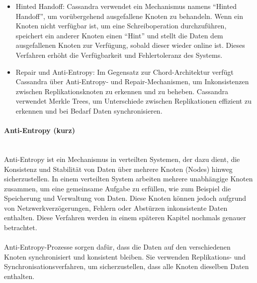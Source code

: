 \documentclass[../vs-script-first-v01.tex]{subfiles}
\begin{document}
\begin{itemize}
\item Hinted Handoff: Cassandra verwendet ein Mechanismus namens \enquote{Hinted Handoff}, um vorübergehend ausgefallene Knoten zu behandeln. Wenn ein Knoten nicht verfügbar ist, um eine Schreiboperation durchzuführen, speichert ein anderer Knoten einen \enquote{Hint} und stellt die Daten dem ausgefallenen Knoten zur Verfügung, sobald dieser wieder online ist. Dieses Verfahren erhöht die Verfügbarkeit und Fehlertoleranz des Systems.
\item Repair und Anti-Entropy: Im Gegensatz zur Chord-Architektur verfügt Cassandra über Anti-Entropy- und Repair-Mechanismen, um Inkonsistenzen zwischen Replikationsknoten zu erkennen und zu beheben. Cassandra verwendet Merkle Trees, um Unterschiede zwischen Replikationen effizient zu erkennen und bei Bedarf Daten synchronisieren.
\end{itemize}
\paragraph{Anti-Entropy (kurz)\\\\}
Anti-Entropy ist ein Mechanismus in verteilten Systemen, der dazu dient, die Konsistenz und Stabilität von Daten über mehrere Knoten (Nodes) hinweg sicherzustellen. In einem verteilten System arbeiten mehrere unabhängige Knoten zusammen, um eine gemeinsame Aufgabe zu erfüllen, wie zum Beispiel die Speicherung und Verwaltung von Daten. Diese Knoten können jedoch aufgrund von Netzwerkverzögerungen, Fehlern oder Abstürzen inkonsistente Daten enthalten. Diese Verfahren werden in einem späteren Kapitel nochmals genauer betrachtet. 
\\\\
Anti-Entropy-Prozesse sorgen dafür, dass die Daten auf den verschiedenen Knoten synchronisiert und konsistent bleiben. Sie verwenden Replikations- und Synchronisationsverfahren, um sicherzustellen, dass alle Knoten dieselben Daten enthalten.

\label{Woche06}
\end{document}
